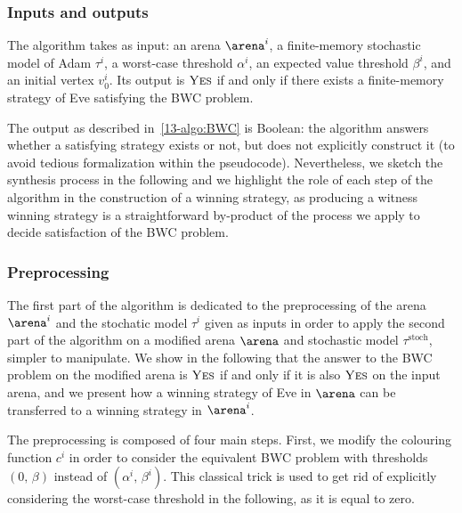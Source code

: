 \subsubsection*{Inputs and outputs} The algorithm takes as input: an arena $\arena^{i}$, a finite-memory stochastic model of Adam $\tau^{i}$, a worst-case threshold $\alpha^{i}$, an expected value threshold $\beta^{i}$, and an initial vertex $v_0^{i}$. Its output is $\textsc{Yes}$ if and only if there exists a finite-memory strategy of Eve satisfying the BWC problem.

The output as described in~\cref{13-algo:BWC} is Boolean: the algorithm answers whether a satisfying strategy exists or not, but does not explicitly construct it (to avoid tedious formalization within the pseudocode). Nevertheless, we sketch the synthesis process in the following and we highlight the role of each step of the algorithm in the construction of a winning strategy, as producing a witness winning strategy is a straightforward by-product of the process we apply to decide satisfaction of the BWC problem.


\subsubsection*{Preprocessing} The first part of the algorithm is dedicated to the preprocessing of the arena $\arena^{i}$ and the stochatic model $\tau^{i}$ given as inputs in order to apply the second part of the algorithm on a modified arena $\arena$ and stochastic model $\tau^{\text{stoch}}$, simpler to manipulate. We show in the following that the answer to the BWC problem on the modified arena is $\textsc{Yes}$ if and only if it is also $\textsc{Yes}$ on the input arena, and we present how a winning strategy of Eve in $\arena$ can be transferred to a winning strategy in $\arena^{i}$.

The preprocessing is composed of four main steps. First, we modify the colouring function $c^i$ in order to consider the equivalent BWC problem with thresholds $(0,\, \beta)$ instead of $(\alpha^{i},\, \beta^{i})$. This classical trick is used to get rid of explicitly considering the worst-case threshold in the following, as it is equal to zero.

